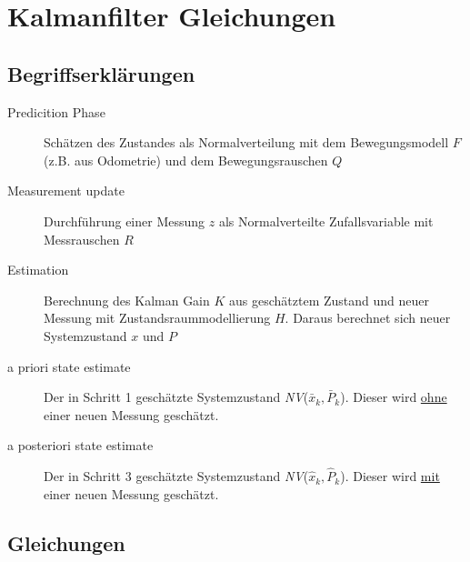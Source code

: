 \chapter{Kalmanfilter Gleichungen}
\label{chp:kalmanfilterGleichungen}

\section{Begriffserklärungen}
\begin{description}
	\item[Predicition Phase] Schätzen des Zustandes als Normalverteilung mit dem Bewegungsmodell $F$ (z.B. aus Odometrie) und dem Bewegungsrauschen $Q$
	\item[Measurement update] Durchführung einer Messung $z$ als Normalverteilte Zufallsvariable mit Messrauschen $R$
	\item[Estimation] Berechnung des Kalman Gain $K$ aus geschätztem Zustand und neuer Messung mit Zustandsraummodellierung $H$. Daraus
	berechnet sich neuer Systemzustand $x$ und $P$
	\item[a priori state estimate] Der in Schritt 1 geschätzte Systemzustand \textit{NV}($\bar{x}_k, \bar{P}_k$). Dieser wird \underline{ohne} einer neuen Messung geschätzt.
	\item[a posteriori state estimate] Der in Schritt 3 geschätzte Systemzustand \textit{NV}($\hat{x}_k, \hat{P}_k$). Dieser wird \underline{mit} einer neuen Messung geschätzt.
\end{description}



\section{Gleichungen}

